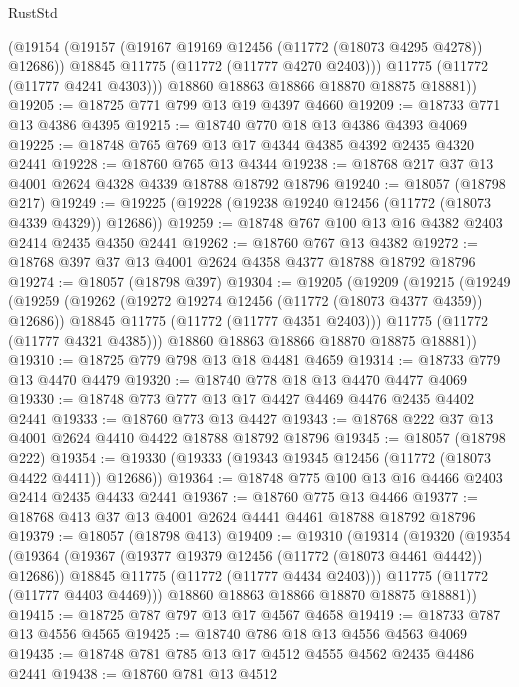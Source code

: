 \begin{lexlean}{RustStd}
\begin{coremodule}
          (@19154
            (@19157 (@19167 @19169 @12456 (@11772 (@18073 @4295 @4278)) @12686))
            @18845
            @11775
            (@11772 (@11777 @4270 @2403)))
          @11775
          (@11772 (@11777 @4241 @4303)))
        @18860
        @18863
        @18866
        @18870
        @18875
        @18881))
@19205 := @18725 @771 @799 @13 @19 @4397 @4660
@19209 := @18733 @771 @13 @4386 @4395
@19215 := @18740 @770 @18 @13 @4386 @4393 @4069
@19225 := @18748 @765 @769 @13 @17 @4344 @4385 @4392 @2435 @4320 @2441
@19228 := @18760 @765 @13 @4344
@19238 := @18768 @217 @37 @13 @4001 @2624 @4328 @4339 @18788 @18792 @18796
@19240 := @18057 (@18798 @217)
@19249 := @19225 (@19228 (@19238 @19240 @12456 (@11772 (@18073 @4339 @4329)) @12686))
@19259 := @18748 @767 @100 @13 @16 @4382 @2403 @2414 @2435 @4350 @2441
@19262 := @18760 @767 @13 @4382
@19272 := @18768 @397 @37 @13 @4001 @2624 @4358 @4377 @18788 @18792 @18796
@19274 := @18057 (@18798 @397)
@19304 := @19205
    (@19209
      (@19215
        (@19249
          (@19259
            (@19262 (@19272 @19274 @12456 (@11772 (@18073 @4377 @4359)) @12686))
            @18845
            @11775
            (@11772 (@11777 @4351 @2403)))
          @11775
          (@11772 (@11777 @4321 @4385)))
        @18860
        @18863
        @18866
        @18870
        @18875
        @18881))
@19310 := @18725 @779 @798 @13 @18 @4481 @4659
@19314 := @18733 @779 @13 @4470 @4479
@19320 := @18740 @778 @18 @13 @4470 @4477 @4069
@19330 := @18748 @773 @777 @13 @17 @4427 @4469 @4476 @2435 @4402 @2441
@19333 := @18760 @773 @13 @4427
@19343 := @18768 @222 @37 @13 @4001 @2624 @4410 @4422 @18788 @18792 @18796
@19345 := @18057 (@18798 @222)
@19354 := @19330 (@19333 (@19343 @19345 @12456 (@11772 (@18073 @4422 @4411)) @12686))
@19364 := @18748 @775 @100 @13 @16 @4466 @2403 @2414 @2435 @4433 @2441
@19367 := @18760 @775 @13 @4466
@19377 := @18768 @413 @37 @13 @4001 @2624 @4441 @4461 @18788 @18792 @18796
@19379 := @18057 (@18798 @413)
@19409 := @19310
    (@19314
      (@19320
        (@19354
          (@19364
            (@19367 (@19377 @19379 @12456 (@11772 (@18073 @4461 @4442)) @12686))
            @18845
            @11775
            (@11772 (@11777 @4434 @2403)))
          @11775
          (@11772 (@11777 @4403 @4469)))
        @18860
        @18863
        @18866
        @18870
        @18875
        @18881))
@19415 := @18725 @787 @797 @13 @17 @4567 @4658
@19419 := @18733 @787 @13 @4556 @4565
@19425 := @18740 @786 @18 @13 @4556 @4563 @4069
@19435 := @18748 @781 @785 @13 @17 @4512 @4555 @4562 @2435 @4486 @2441
@19438 := @18760 @781 @13 @4512

\end{coremodule}
\end{lexlean}
